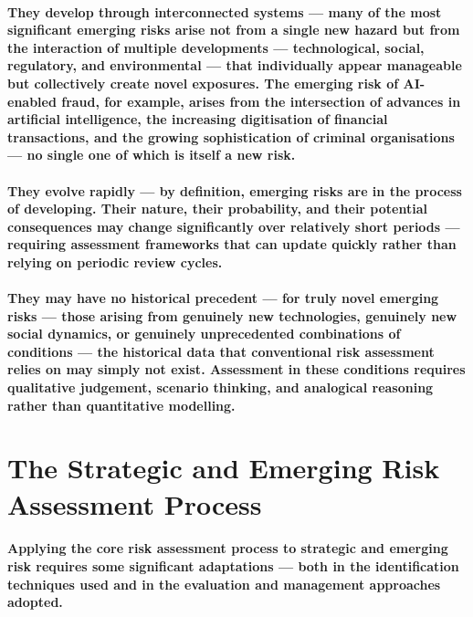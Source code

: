 \paragraph{\textbf{They develop through interconnected systems} — many of the most significant emerging risks arise not from a single new hazard but from the interaction of multiple developments — technological, social, regulatory, and environmental — that individually appear manageable but collectively create novel exposures. The emerging risk of AI-enabled fraud, for example, arises from the intersection of advances in artificial intelligence, the increasing digitisation of financial transactions, and the growing sophistication of criminal organisations — no single one of which is itself a new risk.}
\paragraph{\textbf{They evolve rapidly} — by definition, emerging risks are in the process of developing. Their nature, their probability, and their potential consequences may change significantly over relatively short periods — requiring assessment frameworks that can update quickly rather than relying on periodic review cycles.}
\paragraph{\textbf{They may have no historical precedent} — for truly novel emerging risks — those arising from genuinely new technologies, genuinely new social dynamics, or genuinely unprecedented combinations of conditions — the historical data that conventional risk assessment relies on may simply not exist. Assessment in these conditions requires qualitative judgement, scenario thinking, and analogical reasoning rather than quantitative modelling.}

\section{The Strategic and Emerging Risk Assessment Process}
\paragraph{Applying the core risk assessment process to strategic and emerging risk requires some significant adaptations — both in the identification techniques used and in the evaluation and management approaches adopted.}

